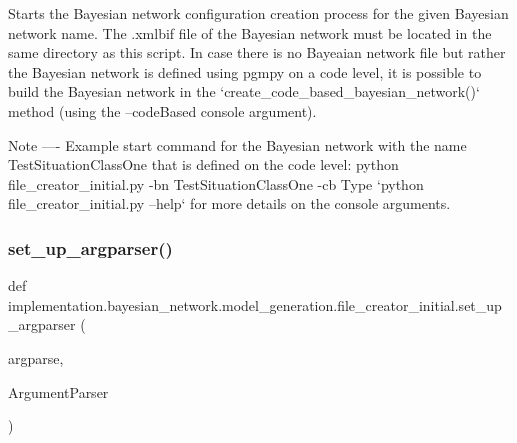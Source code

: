 \begin{DoxyVerb}Starts the Bayesian network configuration creation process for the given Bayesian network name.
The .xmlbif file of the Bayesian network must be located in the same directory as this script.
In case there is no Bayeaian network file but rather the Bayesian network is defined using pgmpy on a code level,
it is possible to build the Bayesian network in the `create_code_based_bayesian_network()` method (using the
--codeBased console argument).

Note
----
Example start command for the Bayesian network with the name TestSituationClassOne that is defined on the code
level: python file_creator_initial.py -bn TestSituationClassOne -cb
Type `python file_creator_initial.py --help` for more details on the console arguments.
\end{DoxyVerb}
 \mbox{\label{namespaceimplementation_1_1bayesian__network_1_1model__generation_1_1file__creator__initial_abcafef44805ec64399b6960daaa32b65}} 
\subsubsection{\texorpdfstring{set\+\_\+up\+\_\+argparser()}{set\_up\_argparser()}}
{\footnotesize\ttfamily def implementation.\+bayesian\+\_\+network.\+model\+\_\+generation.\+file\+\_\+creator\+\_\+initial.\+set\+\_\+up\+\_\+argparser (\begin{DoxyParamCaption}\item[{}]{argparse,  }\item[{}]{Argument\+Parser }\end{DoxyParamCaption})}

\mbox{\label{namespaceimplementation_1_1bayesian__network_1_1model__generation_1_1file__creator__initial_a98d88f0c32f8caacc0f858c06b57e274}} 
